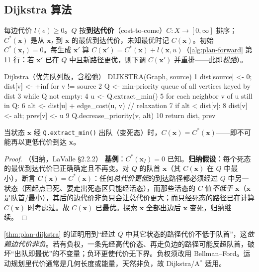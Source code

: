 \subsection{Dijkstra 算法}
\label{sec:plan-dijkstra}

每边代价 $l(e)\ge0$。$Q$ 按\textbf{到达代价}（cost-to-come）$C:X\to[0,\infty]$ 排序；$C^*(\mathbf{x})$ 是从 $\mathbf{x}_I$ 到 $\mathbf{x}$ 的最优到达代价，未知最优时记 $C(\mathbf{x})$。初始 $C^*(\mathbf{x}_I)=0$。每生成 $\mathbf{x}'$ 算 $C(\mathbf{x}')=C^*(\mathbf{x})+l(\mathbf{x},u)$（\cref{alg:plan-forward} 第 11 行：若 $\mathbf{x}'$ 已在 $Q$ 中且新路径更优，则下调 $C(\mathbf{x}')$ 并重排——此即\emph{松弛}）。

\begin{codebox}[text]{Dijkstra（优先队列版，含松弛）}
DIJKSTRA(Graph, source)
 1  dist[source] <- 0; dist[v] <- +inf for v != source
 2  Q <- min-priority queue of all vertices keyed by dist
 3  while Q not empty:
 4      u <- Q.extract_min()
 5      for each neighbor v of u still in Q:
 6          alt <- dist[u] + edge_cost(u, v)          // relaxation
 7          if alt < dist[v]:
 8              dist[v] <- alt; prev[v] <- u
 9              Q.decrease_priority(v, alt)
10  return dist, prev
\end{codebox}

\begin{theorem}\label{thm:plan-dijkstra}
当状态 $\mathbf{x}$ 经 \texttt{Q.\allowbreak extract\_min()} 出队（变死态）时，$C(\mathbf{x})=C^*(\mathbf{x})$——即不可能再以更低代价到达 $\mathbf{x}$。
\end{theorem}
\begin{proof}（归纳，LaValle\cite{lavalle2006planning} §2.2.2）
\textbf{基例}：$C^*(\mathbf{x}_I)=0$ 已知。\textbf{归纳假设}：每个死态的最优到达代价已正确确定且不再变。对 $Q$ 的队首 $\mathbf{x}$（其 $C(\mathbf{x})$ 在 $Q$ 中最小），断言 $C(\mathbf{x})=C^*(\mathbf{x})$：任何\emph{总代价更低}的到达路径都必须经过 $Q$ 中另一状态（因起点已死、要走出死态区只能经活态），而那些活态的 $C$ 值\emph{不低于} $\mathbf{x}$（$\mathbf{x}$ 是队首/最小），其后的边代价非负只会让总代价更大；而只经死态的路径已在计算 $C(\mathbf{x})$ 时考虑过。故 $C(\mathbf{x})$ 已最优。探索 $\mathbf{x}$ 全部出边后 $\mathbf{x}$ 变死，归纳继续。
\end{proof}

\begin{pitfall}
\cref{thm:plan-dijkstra} 的证明用到“经过 $Q$ 中其它状态的路径代价不低于队首”，这\emph{依赖边代价非负}。若有负权，一条先经高代价态、再走负边的路径可能反超队首，破坏“出队即最优”的不变量；负环更使代价无下界。负权须改用 Bellman--Ford。运动规划里代价通常是几何长度或能量，天然非负，故 Dijkstra/A$^*$ 适用。
\end{pitfall}

